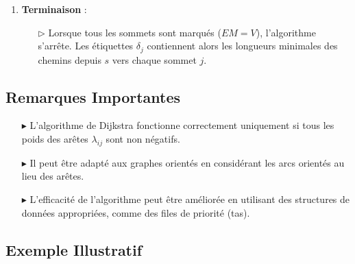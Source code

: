 \documentclass{report}
\begin{document}
\begin{multicols*}{2}
\begin{enumerate}
    \item \textbf{Terminaison} :
        \begin{itemize}
            \item[\( \rhd \)] Lorsque tous les sommets sont marqués (\( EM = V \)), l'algorithme s'arrête. Les étiquettes \( \delta_j \) contiennent alors les longueurs minimales des chemins depuis \( s \) vers chaque sommet \( j \).
        \end{itemize}
\end{enumerate}

\subsection{Remarques Importantes}

\begin{itemize}
    \item[\( \blacktriangleright \)] L'algorithme de Dijkstra fonctionne correctement uniquement si tous les poids des arêtes \( \lambda_{ij} \) sont non négatifs.
    \item[\( \blacktriangleright \)] Il peut être adapté aux graphes orientés en considérant les arcs orientés au lieu des arêtes.
    \item[\( \blacktriangleright \)] L'efficacité de l'algorithme peut être améliorée en utilisant des structures de données appropriées, comme des files de priorité (tas).
\end{itemize}

\subsection{Exemple Illustratif}

\begin{center}


\end{center}
\end{multicols*}
\end{document}
